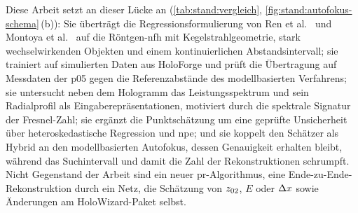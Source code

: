 Diese Arbeit setzt an dieser Lücke an (\cref{tab:stand:vergleich},
\cref{fig:stand:autofokus-schema}\,(b)): Sie überträgt die
Regressionsformulierung von Ren et al.\ \cite{ren2018learning} und
Montoya et al.\ \cite{montoya2023focusnet} auf die Röntgen-\ac{nfh} mit
Kegelstrahlgeometrie, stark wechselwirkenden Objekten und einem
kontinuierlichen Abstandsintervall; sie trainiert auf simulierten Daten
aus HoloForge und prüft die Übertragung auf Messdaten der \ac{p05} gegen die
Referenzabstände des modellbasierten Verfahrens; sie untersucht neben dem
Hologramm das Leistungsspektrum und sein Radialprofil als
Eingaberepräsentationen, motiviert durch die spektrale Signatur der
Fresnel-Zahl; sie ergänzt die Punktschätzung um eine geprüfte
Unsicherheit über heteroskedastische Regression und \ac{npe}; und sie
koppelt den Schätzer als Hybrid an den modellbasierten Autofokus, dessen
Genauigkeit erhalten bleibt, während das Suchintervall und damit die Zahl
der Rekonstruktionen schrumpft. Nicht Gegenstand der Arbeit sind ein neuer
\ac{pr}-Algorithmus, eine Ende-zu-Ende-Rekonstruktion durch ein Netz, die
Schätzung von $z_{02}$, $E$ oder $\Delta x$ sowie Änderungen am HoloWizard-Paket
selbst.
